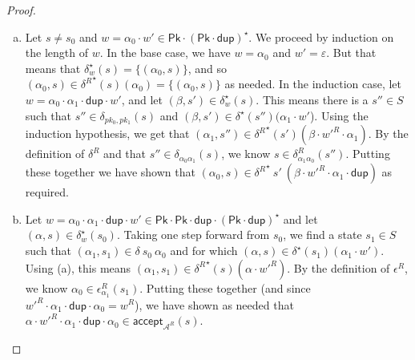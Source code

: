 \documentclass[acmsmall,dvipsnames,nonacm]{acmart}
\newcommand\Pk{\mathsf{Pk}}
\newcommand\pk{\alpha}
\newcommand\pkp{\beta}
\newcommand\dup{\mathsf{dup}}
\newcommand\ddd{\cdot\dup\cdot}
\newcommand\accept{\mathsf{accept}}
\begin{document}
\begin{proof}\ \\
\begin{enumerate}[(a)]
\item Let $s \neq s_0$ and $w = \pk_0\cdot w' \in \Pk\cdot(\Pk\cdot\dup)^\star$.
We proceed by induction on the length of $w$.
In the base case, we have $w = \pk_0$ and $w' = \varepsilon$. But that means that
    $\delta^\star_w (s) = \{(\pk_0, s)\}$, and so $(\pk_0, s) \in {\delta^R}^\star(s)(\pk_0)
= \{(\pk_0,
s)\}$ as needed. In the induction case, let $w = \pk_0\cdot \pk_1 \ddd w'$, and let
$(\pkp, s') \in \delta^\star_w (s)$. This means there is a $s''\in S$
    such that $s''\in\delta_{pk_0,pk_1} (s)$ and $(\pkp,s')\in\delta^\star (s'') (\pk_1\cdot w'$).
    Using the induction hypothesis, we get that $(\pk_1, s'')\in{\delta^R}^\star(s') (\pkp\cdot w'^R\cdot \pk_1)$.
    By the definition of $\delta^R$ and that $s''\in\delta_{\pk_0\pk_1} (s)$, we know
    $s\in\delta^R_{\pk_1\pk_0} (s'')$. Putting these together we have shown that
$(\pk_0, s)\in{\delta^R}^\star\ s'\ (\pkp\cdot w'^R \cdot \pk_1 \cdot\dup)$ as required.

\item Let $w = \pk_0\cdot \pk_1\ddd w'\in\Pk\cdot\Pk\ddd(\Pk\cdot\dup)^\star$ and
  let $(\pk, s)\in \delta^\star_w (s_0)$.
Taking one step forward from $s_0$, we find a state $s_1\in S$ such that $(\pk_1,
s_1) \in \delta\ s_0\ \pk_0$
    and for which $(\pk, s)\in \delta^\star (s_1) (\pk_1\cdot w')$. Using (a), this
means $(\pk_1,
    s_1) \in {\delta^R}^\star (s) (\pk\cdot w'^R)$. By the definition of $\epsilon^R$, we
    know $\pk_0 \in \epsilon^R_{\pk_1} (s_1)$. Putting these together
    (and since $w'^R \cdot \pk_1\ddd \pk_0 = w^R$), we have shown as
    needed that $\pk\cdot w'^R\cdot \pk_1\ddd \pk_0 \in \accept_{\mathcal{A}^R}(s)$.

\end{enumerate}
\end{proof}
\end{document}
